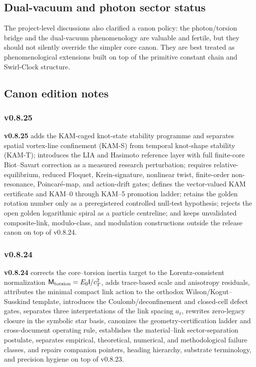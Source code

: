 \documentclass[11pt]{article}
\theoremstyle{definition}
\theoremstyle{plain}
\theoremstyle{remark}
\begin{document}
        \subsection{Dual-vacuum and photon sector status}
            The project-level discussions also clarified a canon policy: the photon/torsion bridge and the dual-vacuum phenomenology are valuable and fertile, but they should not silently override the simpler core canon. They are best treated as phenomenological extensions built on top of the primitive constant chain and Swirl-Clock structure.

        \subsection{Canon edition notes}

        \subsubsection{v0.8.25}
            \textbf{v0.8.25} adds the KAM-caged knot-state stability programme and separates spatial vortex-line confinement (KAM-S) from temporal knot-shape stability (KAM-T); introduces the LIA and Hasimoto reference layer with full finite-core Biot--Savart correction as a measured research perturbation; requires relative-equilibrium, reduced Floquet, Krein-signature, nonlinear twist, finite-order non-resonance, Poincar\'e-map, and action-drift gates; defines the vector-valued KAM certificate and KAM--0 through KAM--5 promotion ladder; retains the golden rotation number only as a preregistered controlled null-test hypothesis; rejects the open golden logarithmic spiral as a particle centreline; and keeps unvalidated composite-link, modulo-class, and modulation constructions outside the release canon on top of v0.8.24.

        \subsubsection{v0.8.24}
            \textbf{v0.8.24} corrects the core--torsion inertia target to the Lorentz-consistent normalization \(\mathsf M_{\rm torsion}=E_0\mathsf I/c_T^2\), adds trace-based scale and anisotropy residuals, attributes the minimal compact link action to the orthodox Wilson/Kogut--Susskind template, introduces the Coulomb/deconfinement and closed-cell defect gates, separates three interpretations of the link spacing \(a_\ell\), rewrites zero-legacy closure in the symbolic star basis, canonizes the geometry-certification ladder and cross-document operating rule, establishes the material--link sector-separation postulate, separates empirical, theoretical, numerical, and methodological failure classes, and repairs companion pointers, heading hierarchy, substrate terminology, and precision hygiene on top of v0.8.23.
\end{document}
